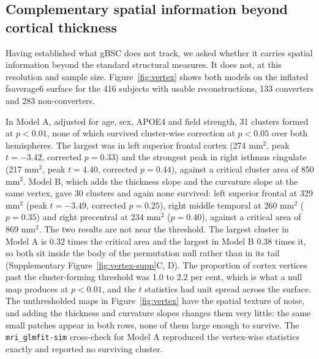 \documentclass[blue]{ludusofficial}  %
\begin{document}
\subsection{Complementary spatial information beyond cortical thickness}
\label{sec:vertex}

Having established what gBSC does not track, we asked whether it carries spatial information beyond the standard structural measures. It does not, at this resolution and sample size. Figure~\ref{fig:vertex} shows both models on the inflated fsaverage6 surface for the 416 subjects with usable reconstructions, 133 converters and 283 non-converters.

In Model A, adjusted for age, sex, APOE4 and field strength, 31 clusters formed at $p < 0.01$, none of which survived cluster-wise correction at $p < 0.05$ over both hemispheres. The largest was in left superior frontal cortex (274 mm$^2$, peak $t = -3.42$, corrected $p = 0.33$) and the strongest peak in right isthmus cingulate (217 mm$^2$, peak $t = 4.40$, corrected $p = 0.44$), against a critical cluster area of 850 mm$^2$. Model B, which adds the thickness slope and the curvature slope at the same vertex, gave 30 clusters and again none survived: left superior frontal at 329 mm$^2$ (peak $t = -3.49$, corrected $p = 0.25$), right middle temporal at 260 mm$^2$ ($p = 0.35$) and right precentral at 234 mm$^2$ ($p = 0.40$), against a critical area of 869 mm$^2$. The two results are not near the threshold. The largest cluster in Model A is 0.32 times the critical area and the largest in Model B 0.38 times it, so both sit inside the body of the permutation null rather than in its tail (Supplementary Figure~\ref{fig:vertex-supp}C, D). The proportion of cortex vertices past the cluster-forming threshold was 1.0 to 2.2 per cent, which is what a null map produces at $p < 0.01$, and the $t$ statistics had unit spread across the surface. The unthresholded maps in Figure~\ref{fig:vertex} have the spatial texture of noise, and adding the thickness and curvature slopes changes them very little: the same small patches appear in both rows, none of them large enough to survive. The \texttt{mri\_glmfit-sim} cross-check for Model A reproduced the vertex-wise statistics exactly and reported no surviving cluster.
\end{document}
